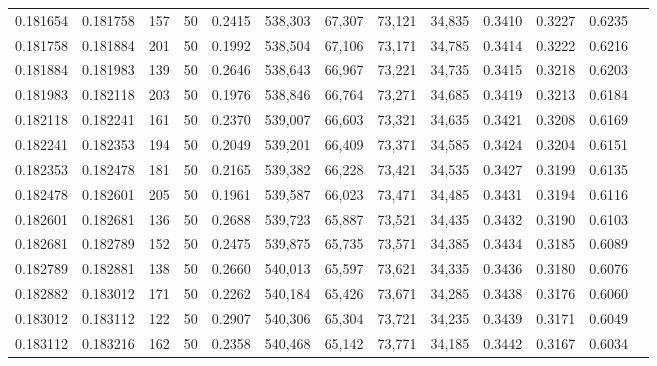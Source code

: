 \begin{tabular}{rrrrrrrrrrrrr}
0.181654 & 0.181758 &   157 &  50 &                                     0.2415 & 538,303 &  67,307 &  73,121 &  34,835 & 0.3410 & 0.3227 & 0.6235 \\
0.181758 & 0.181884 &   201 &  50 &                                     0.1992 & 538,504 &  67,106 &  73,171 &  34,785 & 0.3414 & 0.3222 & 0.6216 \\
0.181884 & 0.181983 &   139 &  50 &                                     0.2646 & 538,643 &  66,967 &  73,221 &  34,735 & 0.3415 & 0.3218 & 0.6203 \\
0.181983 & 0.182118 &   203 &  50 &                                     0.1976 & 538,846 &  66,764 &  73,271 &  34,685 & 0.3419 & 0.3213 & 0.6184 \\
0.182118 & 0.182241 &   161 &  50 &                                     0.2370 & 539,007 &  66,603 &  73,321 &  34,635 & 0.3421 & 0.3208 & 0.6169 \\
0.182241 & 0.182353 &   194 &  50 &                                     0.2049 & 539,201 &  66,409 &  73,371 &  34,585 & 0.3424 & 0.3204 & 0.6151 \\
0.182353 & 0.182478 &   181 &  50 &                                     0.2165 & 539,382 &  66,228 &  73,421 &  34,535 & 0.3427 & 0.3199 & 0.6135 \\
0.182478 & 0.182601 &   205 &  50 &                                     0.1961 & 539,587 &  66,023 &  73,471 &  34,485 & 0.3431 & 0.3194 & 0.6116 \\
0.182601 & 0.182681 &   136 &  50 &                                     0.2688 & 539,723 &  65,887 &  73,521 &  34,435 & 0.3432 & 0.3190 & 0.6103 \\
0.182681 & 0.182789 &   152 &  50 &                                     0.2475 & 539,875 &  65,735 &  73,571 &  34,385 & 0.3434 & 0.3185 & 0.6089 \\
0.182789 & 0.182881 &   138 &  50 &                                     0.2660 & 540,013 &  65,597 &  73,621 &  34,335 & 0.3436 & 0.3180 & 0.6076 \\
0.182882 & 0.183012 &   171 &  50 &                                     0.2262 & 540,184 &  65,426 &  73,671 &  34,285 & 0.3438 & 0.3176 & 0.6060 \\
0.183012 & 0.183112 &   122 &  50 &                                     0.2907 & 540,306 &  65,304 &  73,721 &  34,235 & 0.3439 & 0.3171 & 0.6049 \\
0.183112 & 0.183216 &   162 &  50 &                                     0.2358 & 540,468 &  65,142 &  73,771 &  34,185 & 0.3442 & 0.3167 & 0.6034 \\

\end{tabular}
